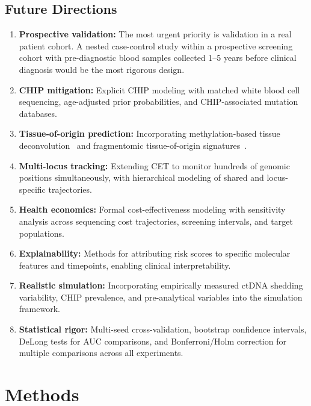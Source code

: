 \documentclass[10pt,a4paper]{article}
\begin{document}
\subsection{Future Directions}

\begin{enumerate}
\item \textbf{Prospective validation:} The most urgent priority is validation in a real patient cohort. A nested case-control study within a prospective screening cohort with pre-diagnostic blood samples collected 1--5 years before clinical diagnosis would be the most rigorous design.
\item \textbf{CHIP mitigation:} Explicit CHIP modeling with matched white blood cell sequencing, age-adjusted prior probabilities, and CHIP-associated mutation databases.
\item \textbf{Tissue-of-origin prediction:} Incorporating methylation-based tissue deconvolution~\cite{guo2017identification} and fragmentomic tissue-of-origin signatures~\cite{snyder2016cell}.
\item \textbf{Multi-locus tracking:} Extending CET to monitor hundreds of genomic positions simultaneously, with hierarchical modeling of shared and locus-specific trajectories.
\item \textbf{Health economics:} Formal cost-effectiveness modeling with sensitivity analysis across sequencing cost trajectories, screening intervals, and target populations.
\item \textbf{Explainability:} Methods for attributing risk scores to specific molecular features and timepoints, enabling clinical interpretability.
\item \textbf{Realistic simulation:} Incorporating empirically measured ctDNA shedding variability, CHIP prevalence, and pre-analytical variables into the simulation framework.
\item \textbf{Statistical rigor:} Multi-seed cross-validation, bootstrap confidence intervals, DeLong tests for AUC comparisons, and Bonferroni/Holm correction for multiple comparisons across all experiments.
\end{enumerate}


\section{Methods}
\end{document}
